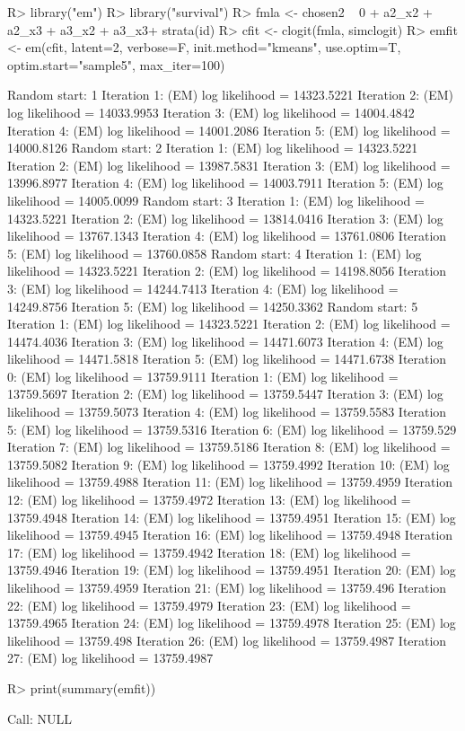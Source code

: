 \documentclass[nojss]{jss}
\begin{document}
\begin{Schunk}
\begin{Sinput}
R> library("em")
R> library("survival")
R> fmla <- chosen2 ~ 0 + a2_x2 + a2_x3 + a3_x2 + a3_x3+ strata(id)
R> cfit <- clogit(fmla, simclogit)
R> emfit <- em(cfit, latent=2, verbose=F, init.method="kmeans", use.optim=T, optim.start="sample5", max_iter=100)
\end{Sinput}
\begin{Soutput}
Random start: 1
Iteration 1: (EM) log likelihood = 14323.5221
Iteration 2: (EM) log likelihood = 14033.9953
Iteration 3: (EM) log likelihood = 14004.4842
Iteration 4: (EM) log likelihood = 14001.2086
Iteration 5: (EM) log likelihood = 14000.8126
Random start: 2
Iteration 1: (EM) log likelihood = 14323.5221
Iteration 2: (EM) log likelihood = 13987.5831
Iteration 3: (EM) log likelihood = 13996.8977
Iteration 4: (EM) log likelihood = 14003.7911
Iteration 5: (EM) log likelihood = 14005.0099
Random start: 3
Iteration 1: (EM) log likelihood = 14323.5221
Iteration 2: (EM) log likelihood = 13814.0416
Iteration 3: (EM) log likelihood = 13767.1343
Iteration 4: (EM) log likelihood = 13761.0806
Iteration 5: (EM) log likelihood = 13760.0858
Random start: 4
Iteration 1: (EM) log likelihood = 14323.5221
Iteration 2: (EM) log likelihood = 14198.8056
Iteration 3: (EM) log likelihood = 14244.7413
Iteration 4: (EM) log likelihood = 14249.8756
Iteration 5: (EM) log likelihood = 14250.3362
Random start: 5
Iteration 1: (EM) log likelihood = 14323.5221
Iteration 2: (EM) log likelihood = 14474.4036
Iteration 3: (EM) log likelihood = 14471.6073
Iteration 4: (EM) log likelihood = 14471.5818
Iteration 5: (EM) log likelihood = 14471.6738
Iteration 0: (EM) log likelihood = 13759.9111
Iteration 1: (EM) log likelihood = 13759.5697
Iteration 2: (EM) log likelihood = 13759.5447
Iteration 3: (EM) log likelihood = 13759.5073
Iteration 4: (EM) log likelihood = 13759.5583
Iteration 5: (EM) log likelihood = 13759.5316
Iteration 6: (EM) log likelihood = 13759.529
Iteration 7: (EM) log likelihood = 13759.5186
Iteration 8: (EM) log likelihood = 13759.5082
Iteration 9: (EM) log likelihood = 13759.4992
Iteration 10: (EM) log likelihood = 13759.4988
Iteration 11: (EM) log likelihood = 13759.4959
Iteration 12: (EM) log likelihood = 13759.4972
Iteration 13: (EM) log likelihood = 13759.4948
Iteration 14: (EM) log likelihood = 13759.4951
Iteration 15: (EM) log likelihood = 13759.4945
Iteration 16: (EM) log likelihood = 13759.4948
Iteration 17: (EM) log likelihood = 13759.4942
Iteration 18: (EM) log likelihood = 13759.4946
Iteration 19: (EM) log likelihood = 13759.4951
Iteration 20: (EM) log likelihood = 13759.4959
Iteration 21: (EM) log likelihood = 13759.496
Iteration 22: (EM) log likelihood = 13759.4979
Iteration 23: (EM) log likelihood = 13759.4965
Iteration 24: (EM) log likelihood = 13759.4978
Iteration 25: (EM) log likelihood = 13759.498
Iteration 26: (EM) log likelihood = 13759.4987
Iteration 27: (EM) log likelihood = 13759.4987
\end{Soutput}
\begin{Sinput}
R> print(summary(emfit))
\end{Sinput}
\begin{Soutput}
Call:
NULL


\end{Soutput}
\end{Schunk}
\end{document}
